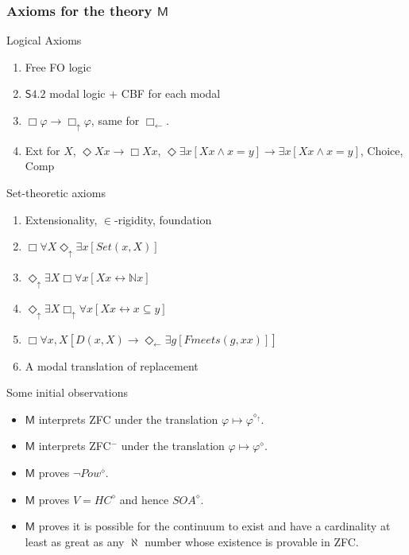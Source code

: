 \documentclass{beamer}
\newcommand{\du}{\Diamond_\uparrow}
\newcommand{\dl}{\Diamond_\leftarrow}
\newcommand{\bu}{\Box_\uparrow}
\newcommand{\bl}{\Box_\leftarrow}
\begin{document}
\begin{frame}
    \frametitle{Axioms for the theory $\mathsf{M}$}
    \begin{block}{Logical Axioms}
    \begin{enumerate}
        \item<2-> Free FO logic
        \item<3-> $\mathsf{S4.2}$ modal logic + CBF for each modal
        \item<4-> $\Box \varphi \rightarrow \bu \varphi$, same for $\bl$.
        \item<5-> Ext for $X$, $\Diamond Xx \rightarrow \Box Xx$, 
        $\Diamond \exists x[Xx \wedge x = y] \rightarrow \exists x[Xx \wedge x = y]$,
        Choice, Comp
    \end{enumerate}
    \end{block}
    \begin{block}{Set-theoretic axioms}
        \begin{enumerate}
        \item<7-> Extensionality, $\in$-rigidity, foundation
        \item<8-> $\Box \forall X \du \exists x [Set(x, X)]$
        \item<9-> $\du \exists X \Box \forall x[Xx \leftrightarrow \mathbb{N}x]$
        \item<10-> $\du \exists X \bu \forall x[Xx \leftrightarrow x \subseteq y]$
        \item<11-> $\Box \forall x, X [D(x, X)\rightarrow \dl \exists g[Fmeets(g, xx)]]$
        \item<12-> A modal translation of replacement
        \end{enumerate}
    \end{block}
\end{frame}
\begin{frame}{Some initial observations}
    \begin{itemize}
        \item<2-> $\mathsf{M}$ interprets ZFC under the translation 
                    $\varphi \mapsto \varphi^{\diamond_\uparrow}$. 
        \item<3-> $\mathsf{M}$ interprets ZFC$^-$ under the translation 
                    $\varphi \mapsto \varphi^\diamond$.
        \item<4-> $\mathsf{M}$ proves $\neg Pow^\diamond$.
        \item<5-> $\mathsf{M}$ proves $V = HC^\diamond$ and hence $SOA^\diamond$.
        \item<6-> $\mathsf{M}$ proves it is possible for the continuum 
                    to exist and have a cardinality at least as great as 
                    any $\aleph$ number whose existence is provable 
                    in ZFC.
    \end{itemize}
\end{frame}
\end{document}
